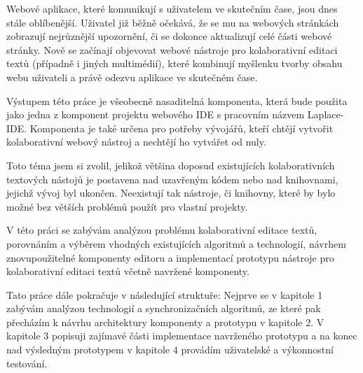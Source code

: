 \begin{introduction}

    Webové aplikace, které komunikují s uživatelem ve skutečním čase, jsou dnes stále oblíbenější.
    Uživatel již běžně očekává, že se mu na webových stránkách zobrazují nejrůznější upozornění, či se dokonce aktualizují celé části webové stránky.
    Nově se začínají objevovat webové nástroje pro kolaborativní editaci textů (případně i jiných multimédií), které kombinují myšlenku tvorby obsahu webu uživateli a právě odezvu aplikace ve skutečném čase.

    Výstupem této práce je všeobecně nasaditelná komponenta, která bude použita jako jedna z komponent projektu webového IDE s pracovním názvem Laplace-IDE.
    Komponenta je také určena pro potřeby vývojářů, kteří chtějí vytvořit kolaborativní webový nástroj a nechtějí ho vytvářet od nuly.

    Toto téma jsem si zvolil, jelikož většina doposud existujících kolaborativních textových nástojů je postavena nad uzavřeným kódem nebo nad knihovnami, jejichž vývoj byl ukončen.
    Neexistují tak nástroje, či knihovny, které by bylo možné bez větších problémů použít pro vlastní projekty.

    V této práci se zabývám analýzou problému kolaborativní editace textů, porovnáním a výběrem vhodných existujících algoritmů a technologií, návrhem znovupoužitelné komponenty editoru a implementací prototypu nástroje pro kolaborativní editaci textů včetně navržené komponenty.

    Tato práce dále pokračuje v následující struktuře:
    Nejprve se v kapitole 1 zabývám analýzou technologií a synchronizačních algoritmů, ze které pak přecházím k návrhu architektury komponenty a prototypu v kapitole 2.
    V kapitole 3 popisuji zajímavé části implementace navrženého prototypu a na konec nad výsledným prototypem v kapitole 4 provádím uživatelské a výkonnostní testování.

\end{introduction}